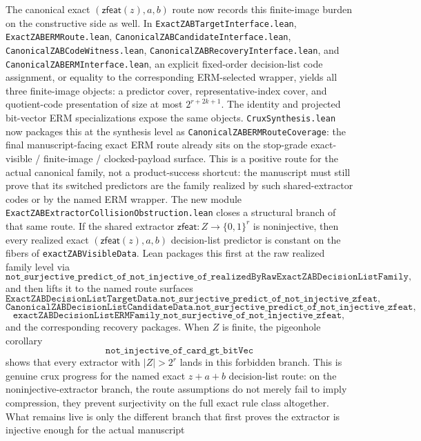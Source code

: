 \documentclass[11pt]{article}
\theoremstyle{remark}
\begin{document}
The canonical exact \((\mathsf{zfeat}(z),a,b)\) route now records this
finite-image burden on the constructive side as well.  In
\texttt{ExactZABTargetInterface.lean}, \texttt{ExactZABERMRoute.lean},
\texttt{CanonicalZABCandidateInterface.lean},
\texttt{CanonicalZABCodeWitness.lean},
\texttt{CanonicalZABRecoveryInterface.lean}, and
\texttt{CanonicalZABERMInterface.lean}, an explicit fixed-order decision-list
code assignment, or equality to the corresponding ERM-selected wrapper, yields
all three finite-image objects: a predictor cover, representative-index cover,
and quotient-code presentation of size at most \(2^{r+2k+1}\).  The identity
and projected bit-vector ERM specializations expose the same objects.
\texttt{CruxSynthesis.lean} now packages this at the synthesis level as
\texttt{CanonicalZABERMRouteCoverage}: the final manuscript-facing exact ERM
route already sits on the stop-grade exact-visible / finite-image /
clocked-payload surface.  This is a positive route for the actual canonical
family, not a product-success shortcut: the manuscript must still prove that
its switched predictors are the family realized by such shared-extractor codes
or by the named ERM wrapper.
The new module \texttt{ExactZABExtractorCollisionObstruction.lean} closes a
structural branch of that same route.  If the shared extractor
\(\mathsf{zfeat} : Z \to \{0,1\}^r\) is noninjective, then every realized exact
\((\mathsf{zfeat}(z),a,b)\) decision-list predictor is constant on the fibers
of \texttt{exactZABVisibleData}.  Lean packages this first at the raw realized
family level via
\[
  \texttt{not\_surjective\_predict\_of\_not\_injective\_of\_realizedByRawExactZABDecisionListFamily},
\]
and then lifts it to the named route surfaces
\[
  \texttt{ExactZABDecisionListTargetData.not\_surjective\_predict\_of\_not\_injective\_zfeat},
\]
\[
  \texttt{CanonicalZABDecisionListCandidateData.not\_surjective\_predict\_of\_not\_injective\_zfeat},
\]
\[
  \texttt{exactZABDecisionListERMFamily\_not\_surjective\_of\_not\_injective\_zfeat},
\]
and the corresponding recovery packages.  When \(Z\) is finite, the
pigeonhole corollary
\[
  \texttt{not\_injective\_of\_card\_gt\_bitVec}
\]
shows that every extractor with \(|Z| > 2^r\) lands in this forbidden branch.
This is genuine crux progress for the named exact \(z{+}a{+}b\) decision-list
route: on the noninjective-extractor branch, the route assumptions do not
merely fail to imply compression, they prevent surjectivity on the full exact
rule class altogether.  What remains live is only the different branch that
first proves the extractor is injective enough for the actual manuscript
\end{document}
